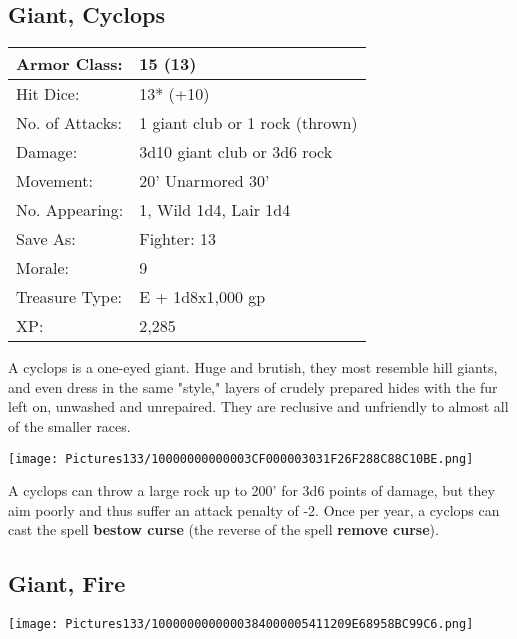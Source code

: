 \documentclass[a4paper,twoside,openany,10pt]{book}
\begin{document}
\begin{multicols}{2}
\subsection*{Giant, Cyclops}\label{giant-cyclops}

\begin{tabularx}{0.48\textwidth}{@{}lX@{}}
Armor Class: & 15 (13) \\\hline
Hit Dice: & 13* (+10) \\\hline
No. of Attacks: & 1 giant club or 1 rock (thrown) \\\hline
Damage: & 3d10 giant club or 3d6 rock \\\hline
Movement: & 20' Unarmored 30' \\\hline
No. Appearing: & 1, Wild 1d4, Lair 1d4 \\\hline
Save As: & Fighter: 13 \\\hline
Morale: & 9 \\\hline
Treasure Type: & E + 1d8x1,000 gp \\\hline
XP: & 2,285 \\\hline
\end{tabularx}\medskip

A cyclops is a one-eyed giant. Huge and brutish, they most resemble hill giants, and even dress in the same "style," layers of crudely prepared hides with the fur left on, unwashed and unrepaired. They are reclusive and unfriendly to almost all of the smaller races.

\begin{center}
	\texttt{[image: Pictures133/10000000000003CF000003031F26F288C88C10BE.png]}
\end{center}


A cyclops can throw a large rock up to 200' for 3d6 points of damage, but they aim poorly and thus suffer an attack penalty of -2. Once per year, a cyclops can cast the spell \textbf{bestow curse} (the reverse of the spell \textbf{remove curse}).


\subsection*{Giant, Fire}\label{giant-fire}


\texttt{[image: Pictures133/1000000000000384000005411209E68958BC99C6.png]}



\end{multicols}
\end{document}
